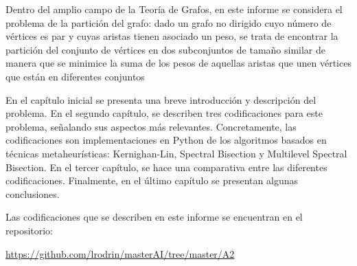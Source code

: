 Dentro del amplio campo de la Teoría de Grafos, en este informe se considera el problema de la partición del grafo: dado un grafo no dirigido cuyo número de vértices es par y cuyas aristas tienen asociado un peso, se trata de encontrar la partición del conjunto de vértices en dos subconjuntos de tamaño similar de manera que se minimice la suma de los pesos de aquellas aristas que unen vértices que están en diferentes conjuntos

En el capítulo inicial se presenta una breve introducción y descripción del problema. En el segundo capítulo, se describen tres codificaciones para este problema, señalando sus aspectos más relevantes. Concretamente, las codificaciones son implementaciones en Python de los algoritmos basados en técnicas metaheurísticas: Kernighan-Lin, Spectral Bisection y Multilevel Spectral Bisection. En el tercer capítulo, se hace una comparativa entre las diferentes codificaciones. Finalmente, en el último capítulo se presentan algunas conclusiones.

Las codificaciones que se describen en este informe se encuentran en el repositorio:

\begin{center}
	\url{https://github.com/lrodrin/masterAI/tree/master/A2}\label{GitHub}
\end{center}

